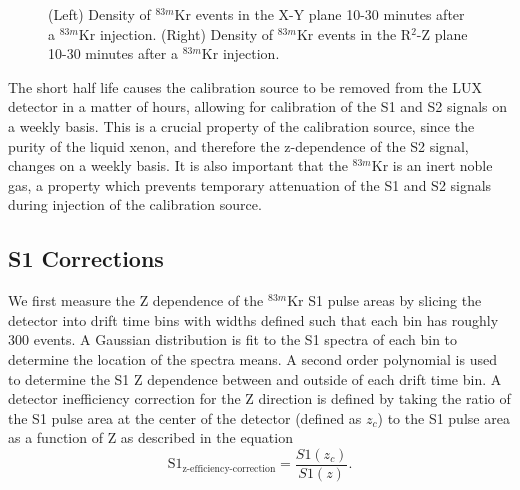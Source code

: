 \documentclass[a4paper,12pt]{article}
\begin{document}
{\begin{figure} 
\centering
{}
\qquad
{}
\caption{ (Left) Density of $^{83m}$Kr events in the X-Y plane 10-30 minutes after a $^{83m}$Kr injection. (Right) Density of $^{83m}$Kr events in the R$^2$-Z plane 10-30 minutes after a $^{83m}$Kr injection.}
\label{fig:LandauPlot}
\end{figure}

The short half life causes the calibration source to be removed from the LUX detector in a matter of hours, allowing for calibration of the S1 and S2 signals on a weekly basis.  This is a crucial property of the calibration source, since the purity of the liquid xenon, and therefore the z-dependence of the S2 signal, changes on a weekly basis.  It is also important that the $^{83m}$Kr is an inert noble gas, a property which prevents temporary attenuation of the S1 and S2 signals during injection of the calibration source. 


\subsection{S1 Corrections}\label{S1SignalCorr}

We first measure the Z dependence of the $^{83m}$Kr S1 pulse areas by slicing the detector into drift time bins with widths defined such that each bin has roughly 300 events.  A Gaussian distribution is fit to the S1 spectra of each bin to determine the location of the spectra means. A second order polynomial is used to determine the S1 Z dependence between and outside of each drift time bin. A detector inefficiency correction for the Z direction is defined by taking the ratio of the S1  pulse area at the center of the detector (defined as $z_c$) to the S1 pulse area as a function of Z as described in the equation
\begin{equation}
\mbox{S}1_{\mbox{z-efficiency-correction}} = \frac{S1(z_c)}{S1(z)}.
\end{equation} 

}
\end{document}
